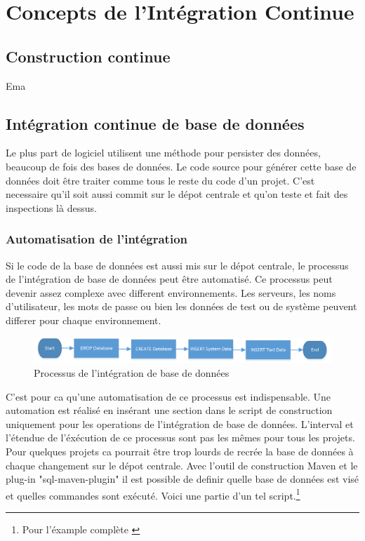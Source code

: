 \section{Concepts de l'Intégration Continue}

\subsection{Construction continue}

Ema

\subsection{Intégration continue de base de données}

Le plus part de logiciel utilisent une méthode pour persister des données, beaucoup de fois des bases de données. Le code source pour générer cette base de données doit être traiter comme tous le reste du code d'un projet. C'est necessaire qu'il soit aussi commit sur le dépot centrale et qu'on teste et fait des inspections là dessus.

\subsubsection{Automatisation de l'intégration}
Si le code de la base de données est aussi mis sur le dépot centrale, le processus de l'intégration de base de données peut être automatisé. Ce processus peut devenir assez complexe avec different environnements. Les serveurs, les noms d'utilisateur, les mots de passe ou bien les données de test ou de système peuvent differer pour chaque environnement.
\begin{figure}[H]
	\centering
		\includegraphics[scale=1]{bilder/database_integration}
	\caption{Processus de l'intégration de base de données}
	\label{fig:processus}
\end{figure}

C'est pour ca qu'une automatisation de ce processus est indispensable. Une automation est réalisé en insérant une section dans le script de construction uniquement pour les operations de l'intégration de base de données. L'interval et l'étendue de l'éxécution de ce processus sont pas les mêmes pour tous les projets. Pour quelques projets ca pourrait être trop lourds de recrée la base de données à chaque changement sur le dépot centrale. Avec l'outil de construction Maven et le plug-in "sql-maven-plugin" il est possible de definir quelle base de données est visé et quelles commandes sont exécuté. Voici une partie d'un tel script.\footnote{Pour l'éxample complète \cite{mvnsql}}

